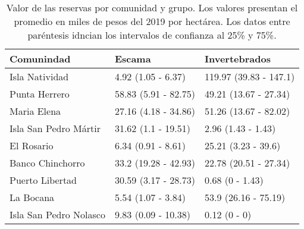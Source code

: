 \begin{table}[!h]

\caption{\label{tab:tot_val}Valor de las reservas por comunidad y grupo. Los valores presentan el promedio en miles de pesos del 2019 por hectárea. Los datos entre paréntesis idncian los intervalos de confianza al 25\% y 75\%.}
\centering
\begin{tabular}[t]{lll}
\toprule
Comunindad & Escama & Invertebrados\\
\midrule
Isla Natividad & 4.92 (1.05 - 6.37) & 119.97 (39.83 - 147.1)\\
Punta Herrero & 58.83 (5.91 - 82.75) & 49.21 (13.67 - 27.34)\\
Maria Elena & 27.16 (4.18 - 34.86) & 51.26 (13.67 - 82.02)\\
Isla San Pedro Mártir & 31.62 (1.1 - 19.51) & 2.96 (1.43 - 1.43)\\
El Rosario & 6.34 (0.91 - 8.61) & 25.21 (3.23 - 39.6)\\
\addlinespace
Banco Chinchorro & 33.2 (19.28 - 42.93) & 22.78 (20.51 - 27.34)\\
Puerto Libertad & 30.59 (3.17 - 28.73) & 0.68 (0 - 1.43)\\
La Bocana & 5.54 (1.07 - 3.84) & 53.9 (26.16 - 75.19)\\
Isla San Pedro Nolasco & 9.83 (0.09 - 10.38) & 0.12 (0 - 0)\\
\bottomrule
\end{tabular}
\end{table}